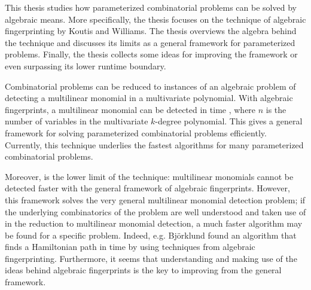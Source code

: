 %
%
\begin{enabstract}
  This thesis studies how parameterized combinatorial problems can be 
  solved %
  by algebraic means. More specifically, the thesis focuses on the technique 
  of algebraic fingerprinting by Koutis and Williams. The thesis 
  overviews the algebra behind the technique and discusses its limits 
  as a general framework for parameterized problems. 
  Finally, the thesis collects some ideas 
  for improving the framework or even surpassing its lower runtime boundary.

  Combinatorial problems can be reduced to instances of an algebraic problem 
  of detecting a multilinear monomial in a multivariate polynomial. 
  With algebraic fingerprints, a multilinear monomial can be detected 
  in time , where $n$ is the number of variables in the 
  multivariate $k$-degree polynomial. This gives a general framework for solving parameterized 
  combinatorial problems efficiently. 
  Currently, this technique underlies the fastest algorithms 
  for many parameterized combinatorial problems. 

  Moreover,  is the lower limit of the technique: 
  multilinear monomials cannot be detected faster 
  with the general framework of algebraic fingerprints. 
  However, this framework solves the very general multilinear monomial 
  detection problem; if the underlying combinatorics of the problem are well understood 
  and taken use of in the reduction to multilinear monomial detection, 
  a much faster algorithm may be 
  found for a specific problem. Indeed, e.g. 
  Björklund found an algorithm that 
  finds a Hamiltonian path in time  by 
  using techniques from algebraic fingerprinting. Furthermore, 
  it seems that understanding and making use of the ideas behind algebraic fingerprints 
  is the key to improving from the general framework.
%
\end{enabstract}
